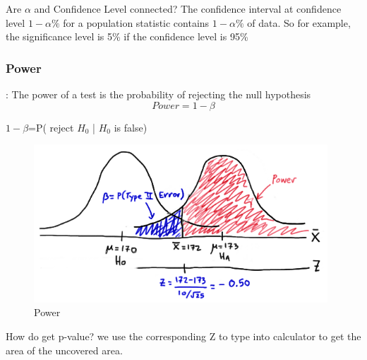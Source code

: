 \begin{Question}
    Are \(\alpha\) and Confidence Level connected?
    \solution The confidence interval at confidence level \(1-\alpha\%\) for a population statistic contains \(1-\alpha\%\) of data. So for example, the significance level is 5\% if the confidence level is 95\%
\end{Question}
\subsubsection{Power}
: The power of a test is the probability of rejecting the null hypothesis
\begin{equation}
    Power=1-\beta
\end{equation}
\begin{center}
    \(1-\beta\)=P( reject \(H_{0}\) | \(H_{0}\) is false)
\end{center}
\begin{figure}[H]
    \centering
    \includegraphics[width=110mm]{power.png}
    \caption{Power}
    \label{Figure}
\end{figure}
\begin{Question}
    How do get p-value?
    \solution we use the corresponding Z to type into calculator to get the area of the uncovered area.
\end{Question}

